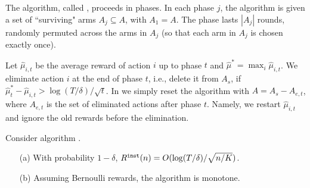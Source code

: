 


The algorithm, called \SuccesiveEliminationReset, proceeds in phases. In each phase $j$, the algorithm is given a set of ``surviving" arms $A_j\subseteq A$, with $A_1=A$. The phase lasts $|A_j|$ rounds, randomly permuted across the arms in $A_j$ (so that each arm in $A_j$ is chosen exactly once).



Let $\hat{\mu}_{i,t}$ be the average reward of action $i$ up
to phase $t$ and $\hat{\mu}^*=\max_i \hat{\mu}_{i,t}$. We eliminate
action $i$ at the end of phase $t$, i.e., delete it from $A_s$, if
$\hat{\mu}_t^*-\hat{\mu}_{i,t} > \log(T/\delta)/\sqrt{t}$.
In \SuccesiveEliminationReset we simply reset the algorithm with
$A=A_s-A_{e,t}$, where $A_{e,t}$ is the set of eliminated actions
after phase $t$. Namely, we restart $\hat{\mu}_{i,t}$ and ignore the
old rewards before the elimination.

\begin{lemma}
Consider algorithm \SuccesiveEliminationReset.
\begin{itemize}
\item[(a)]
With probability $1-\delta$, $R^{\mathtt{inst}}(n)=O(\log(T/\delta)/\sqrt{n/K})$.

\item[(b)]
Assuming Bernoulli rewards, the algorithm is monotone.
\end{itemize}
\end{lemma}

